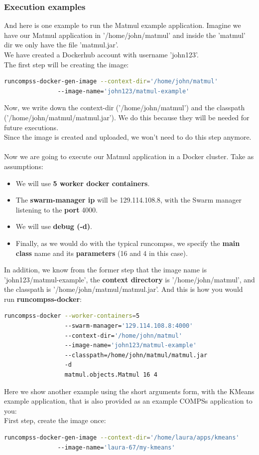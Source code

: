 \subsubsection{Execution examples}
And here is one example to run the Matmul example application. 
Imagine we have our Matmul application in '/home/john/matmul' and inside the 'matmul' dir we only have the file 'matmul.jar'. \\
We have created a Dockerhub account with username 'john123'.
\\
The first step will be creating the image:
\begin{lstlisting}[language=bash]
runcompss-docker-gen-image --context-dir='/home/john/matmul'
			   --image-name='john123/matmul-example'
\end{lstlisting}
Now, we write down the context-dir ('/home/john/matmul') and the classpath ('/home/john/matmul/matmul.jar'). We do this because they will be needed for future executions. \\
Since the image is created and uploaded, we won't need to do this step anymore.
\\
\\
Now we are going to execute our Matmul application in a Docker cluster.
Take as assumptions:
\begin{itemize}  
\item We will use \textbf{5 worker docker containers}.
\item The \textbf{swarm-manager ip} will be 129.114.108.8, with the Swarm manager listening to the \textbf{port} 4000.
\item We will use \textbf{debug (-d)}.
\item Finally, as we would do with the typical runcompss, we specify the \textbf{main class} name and its \textbf{parameters} (16 and 4 in this case).
\end{itemize}
In addition, we know from the former step that the image name is 'john123/matmul-example', 
the \textbf{context directory} is '/home/john/matmul', and the classpath is '/home/john/matmul/matmul.jar'.
And this is how you would run \textbf{runcompss-docker}:
\begin{lstlisting}[language=bash]
runcompss-docker --worker-containers=5
                 --swarm-manager='129.114.108.8:4000'
                 --context-dir='/home/john/matmul'
                 --image-name='john123/matmul-example'
                 --classpath=/home/john/matmul/matmul.jar
                 -d
                 matmul.objects.Matmul 16 4
\end{lstlisting}           
Here we show another example using the short arguments form, with the KMeans example application, 
that is also provided as an example COMPSs application to you:
\\
First step, create the image once:
\begin{lstlisting}[language=bash]
runcompss-docker-gen-image --context-dir='/home/laura/apps/kmeans'
			   --image-name='laura-67/my-kmeans'
\end{lstlisting}


